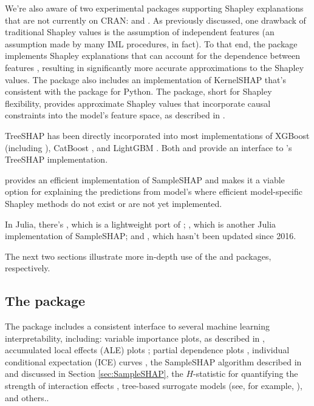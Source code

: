 We're also aware of two experimental packages supporting Shapley
explanations that are not currently on CRAN: 
\citep{R-sellereite} and  \citep{R-shapFlex}. As
previously discussed, one drawback of traditional Shapley values is the
assumption of independent features (an assumption made by many IML
procedures, in fact). To that end, the  package implements
Shapley explanations that can account for the dependence between
features \citep{aas-2019-explaining}, resulting in significantly more
accurate approximations to the Shapley values. The package also includes
an implementation of KernelSHAP that's consistent with the 
package for Python. The  package, short for Shapley
flexibility, provides approximate Shapley values that incorporate causal
constraints into the model's feature space, as described in
\citet{frye-2019-asymmetric}.

TreeSHAP has been directly incorporated into most implementations of
XGBoost \citep{chen-2016-xgboost} (including 
\citep{R-xgboost}), CatBoost \citep{eronika-2017-catboost}, and LightGBM
\citep{ke-2017-lightgbm}. Both  \citep{R-fastshap} and
 \citep{R-SHAPforxgboost} provide an interface
to 's TreeSHAP implementation.

 provides an efficient implementation of SampleSHAP
and makes it a viable option for explaining the predictions from model's
where efficient model-specific Shapley methods do not exist or are not
yet implemented.

In Julia, there's , which is a lightweight port of
; , which is another Julia implementation
of SampleSHAP; and , which hasn't been updated
since 2016.

The next two sections illustrate more in-depth use of the  and
 packages, respectively.

\subsection{The  package}

The  package includes a consistent interface to several machine
learning interpretability, including: variable importance plots, as
described in \citet{fisher-2019-models}, accumulated local effects (ALE)
plots \citep{apley-2019-ale}; partial dependence plots
\citep{friedman-2001-greedy}, individual conditional expectation (ICE)
curves \citep{goldstein-peeking-2015}, the SampleSHAP algorithm
described in \citet{strumbelj-2014-explaining} and discussed in Section
\ref{sec:SampleSHAP}, the \(H\)-statistic for quantifying the strength
of interaction effects \citep{friedman-2008-predictive}, tree-based
surrogate models (see, for example, \citet[Chap. 5]{molnar-2019-iml}),
and others..

